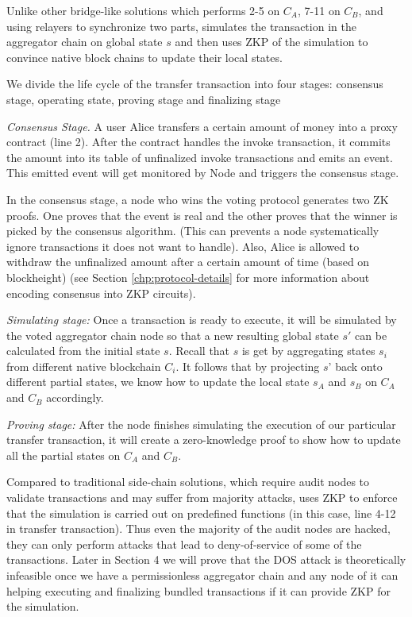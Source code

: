 Unlike other bridge-like solutions which performs 2-5 on $C_A$, 7-11 on $C_B$, and using relayers to synchronize two parts, \dprotocol simulates the transaction in the aggregator chain on global state $s$ and then uses ZKP of the simulation to convince native block chains to update their local states.

We divide the life cycle of the transfer transaction into four stages: consensus stage, operating state, proving stage and finalizing stage



\smallskip\noindent\emph{Consensus Stage.}
A user Alice transfers a certain amount of money into a proxy contract (line 2). After the contract handles the invoke transaction, it commits the amount into its table of unfinalized invoke transactions and emits an event. This emitted event will get monitored by \dprotocol Node and triggers the consensus stage.

In the consensus stage, a node who wins the voting protocol generates two ZK proofs. One proves that the event is real and the other proves that the winner is picked by the consensus algorithm. (This can prevents a node systematically ignore transactions it does not want to handle). Also, Alice is allowed to withdraw the unfinalized amount after a certain amount of time (based on blockheight) (see Section \ref{chp:protocol-details} for more information about encoding consensus into ZKP circuits).

\smallskip\noindent\emph{Simulating stage:}
Once a transaction is ready to execute, it will be simulated by the voted aggregator chain node so that a new resulting global state $s'$ can be calculated from the initial state $s$. Recall that $s$ is get by aggregating states $s_i$ from different native blockchain $C_i$. It follows that by projecting $s’$ back onto different partial states, we know how to update the local state $s_A$ and $s_B$ on $C_A$ and $C_B$ accordingly.

\smallskip\noindent\emph{Proving stage:}
After the \dprotocol node finishes simulating the execution of our particular transfer transaction, it will create a zero-knowledge proof to show how to update all the partial states on $C_A$  and $C_B$.

Compared to traditional side-chain solutions, which require audit nodes to validate transactions and may suffer from majority attacks, \dprotocol uses ZKP to enforce that the simulation is carried out on predefined functions (in this case, line 4-12 in transfer transaction). Thus even the majority of the audit nodes are hacked, they can only perform attacks that lead to deny-of-service of some of the transactions. Later in Section 4 we will prove that the DOS attack is theoretically infeasible once we have a permissionless aggregator chain and any node of it can helping executing and finalizing bundled transactions if it can provide ZKP for the simulation.

